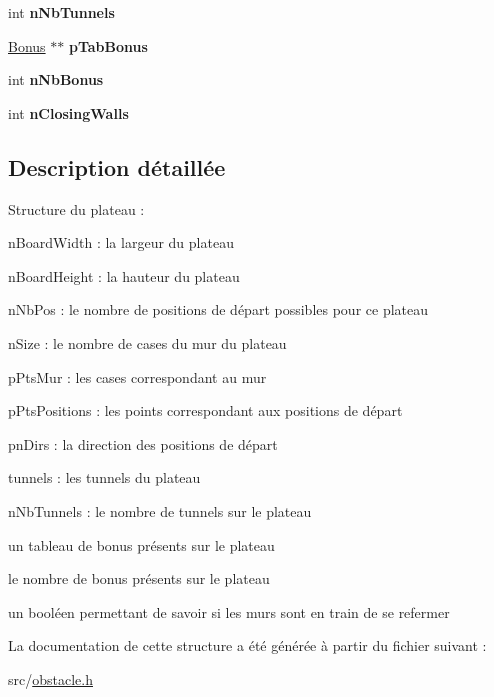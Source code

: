 \begin{DoxyCompactItemize}
\item 
int {\bfseries n\+Nb\+Tunnels}\hypertarget{struct_board_a9abff377be739110b0e7fe6708cb0bbf}{}\label{struct_board_a9abff377be739110b0e7fe6708cb0bbf}

\item 
\hyperlink{struct_bonus}{Bonus} $\ast$$\ast$ {\bfseries p\+Tab\+Bonus}\hypertarget{struct_board_abb264e7d7facdd7742de5d13482d72e3}{}\label{struct_board_abb264e7d7facdd7742de5d13482d72e3}

\item 
int {\bfseries n\+Nb\+Bonus}\hypertarget{struct_board_a8ac28cdfb3bb7a7409393a3e62d83897}{}\label{struct_board_a8ac28cdfb3bb7a7409393a3e62d83897}

\item 
int {\bfseries n\+Closing\+Walls}\hypertarget{struct_board_a1764ac18036257cb14e9c92f0c6ded1d}{}\label{struct_board_a1764ac18036257cb14e9c92f0c6ded1d}

\end{DoxyCompactItemize}


\subsection{Description détaillée}
Structure du plateau \+:
\begin{DoxyItemize}
\item n\+Board\+Width \+: la largeur du plateau
\item n\+Board\+Height \+: la hauteur du plateau
\item n\+Nb\+Pos \+: le nombre de positions de départ possibles pour ce plateau
\item n\+Size \+: le nombre de cases du mur du plateau
\item p\+Pts\+Mur \+: les cases correspondant au mur
\item p\+Pts\+Positions \+: les points correspondant aux positions de départ
\item pn\+Dirs \+: la direction des positions de départ
\item tunnels \+: les tunnels du plateau
\item n\+Nb\+Tunnels \+: le nombre de tunnels sur le plateau
\item un tableau de bonus présents sur le plateau
\item le nombre de bonus présents sur le plateau
\item un booléen permettant de savoir si les murs sont en train de se refermer 
\end{DoxyItemize}

La documentation de cette structure a été générée à partir du fichier suivant \+:\begin{DoxyCompactItemize}
\item 
src/\hyperlink{obstacle_8h}{obstacle.\+h}\end{DoxyCompactItemize}
